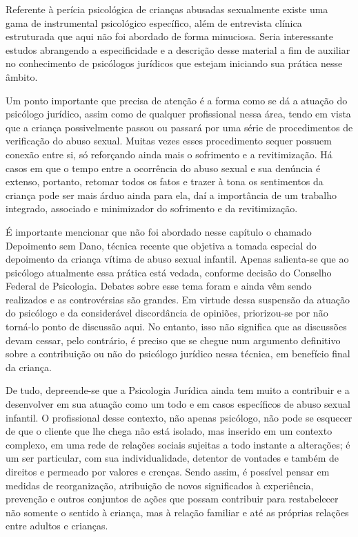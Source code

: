 Referente à perícia psicológica de crianças abusadas sexualmente existe uma gama de instrumental psicológico específico, além de entrevista clínica estruturada que aqui não foi abordado de forma minuciosa. Seria interessante estudos abrangendo a especificidade e a descrição desse material a fim de auxiliar no conhecimento de psicólogos jurídicos que estejam iniciando sua prática nesse âmbito.

Um ponto importante que precisa de atenção é a forma como se dá a atuação do psicólogo jurídico, assim como de qualquer profissional nessa área, tendo em vista que a criança possivelmente passou ou passará por uma série de procedimentos de verificação do abuso sexual. Muitas vezes esses procedimento sequer possuem conexão entre si, só reforçando ainda mais o sofrimento e a revitimização. Há casos em que o tempo entre a ocorrência do abuso sexual e sua denúncia é extenso, portanto, retomar todos os fatos e trazer à tona os sentimentos da criança pode ser mais árduo ainda para ela, daí a importância de um trabalho integrado, associado e minimizador do sofrimento e da revitimização.

É importante mencionar que não foi abordado nesse capítulo o chamado Depoimento sem Dano, técnica recente que objetiva a tomada especial do depoimento da criança vítima de abuso sexual infantil. Apenas salienta-se que ao psicólogo atualmente essa prática está vedada, conforme decisão do Conselho Federal de Psicologia. Debates sobre esse tema foram e ainda vêm sendo realizados e as controvérsias são grandes. Em virtude dessa suspensão da atuação do psicólogo e da considerável discordância de opiniões, priorizou-se por não torná-lo ponto de discussão aqui. No entanto, isso não significa que as discussões devam cessar, pelo contrário, é preciso que se chegue num argumento definitivo sobre a contribuição ou não do psicólogo jurídico nessa técnica, em benefício final da criança.

De tudo, depreende-se que a Psicologia Jurídica ainda tem muito a contribuir e a desenvolver em sua atuação como um todo e em casos específicos de abuso sexual infantil. O profissional desse contexto, não apenas psicólogo, não pode se esquecer de que o cliente que lhe chega não está isolado, mas inserido em um contexto complexo, em uma rede de relações sociais sujeitas a todo instante a alterações; é um ser particular, com sua individualidade, detentor de vontades e também de direitos e permeado por valores e crenças. Sendo assim, é possível pensar em medidas de reorganização, atribuição de novos significados à experiência, prevenção e outros conjuntos de ações que possam contribuir para restabelecer não somente o sentido à criança, mas à relação familiar e até as próprias relações entre adultos e crianças.